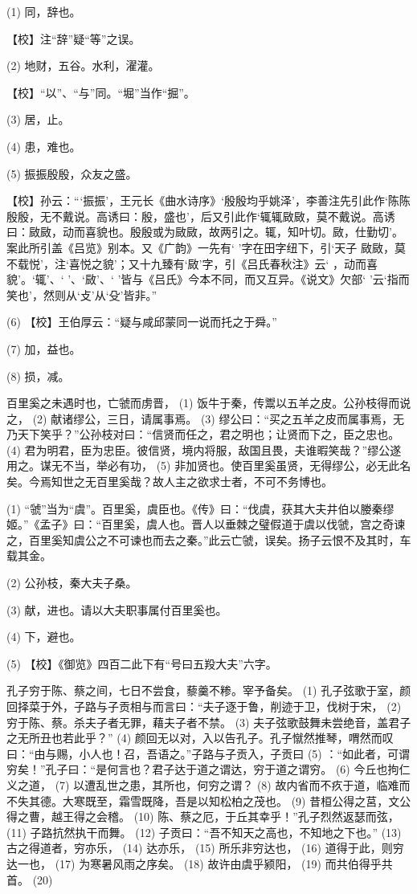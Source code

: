\documentclass[12pt,UTF8]{ctexbook}
\begin{document}
(1) 同，辞也。

【校】注“辞”疑“等”之误。

(2) 地财，五谷。水利，濯灌。

【校】“以”、“与”同。“堀”当作“掘”。

(3) 居，止。

(4) 患，难也。

(5) 振振殷殷，众友之盛。

【校】孙云：“‘振振’，王元长《曲水诗序》‘殷殷均乎姚泽’，李善注先引此作‘陈陈殷殷，无不戴说。高诱曰：殷，盛也’，后又引此作‘辄辄敐敐，莫不戴说。高诱曰：敐敐，动而喜貌也。殷殷或为敐敐，故两引之。辄，知叶切。敐，仕勤切’。案此所引盖《吕览》别本。又《广韵》一先有‘ ’字在田字纽下，引‘天子 敐敐，莫不载悦’，注‘喜悦之貌’；又十九臻有‘敐’字，引《吕氏春秋注》云‘ ，动而喜貌’。‘辄’、‘ ’、‘敐’、‘ ’皆与《吕氏》今本不同，而又互异。《说文》欠部‘ ’云‘指而笑也’，然则从‘攴’从‘殳’皆非。”

(6) 【校】王伯厚云：“疑与咸邱蒙同一说而托之于舜。”

(7) 加，益也。

(8) 损，减。

百里奚之未遇时也，亡虢而虏晋， (1) 饭牛于秦，传鬻以五羊之皮。公孙枝得而说之， (2) 献诸缪公，三日，请属事焉。 (3) 缪公曰：“买之五羊之皮而属事焉，无乃天下笑乎？”公孙枝对曰：“信贤而任之，君之明也；让贤而下之，臣之忠也。 (4) 君为明君，臣为忠臣。彼信贤，境内将服，敌国且畏，夫谁暇笑哉？”缪公遂用之。谋无不当，举必有功， (5) 非加贤也。使百里奚虽贤，无得缪公，必无此名矣。今焉知世之无百里奚哉？故人主之欲求士者，不可不务博也。

(1) “虢”当为“虞”。百里奚，虞臣也。《传》曰：“伐虞，获其大夫井伯以媵秦缪姬。”《孟子》曰：“百里奚，虞人也。晋人以垂棘之璧假道于虞以伐虢，宫之奇谏之，百里奚知虞公之不可谏也而去之秦。”此云亡虢，误矣。扬子云恨不及其时，车载其金。

(2) 公孙枝，秦大夫子桑。

(3) 献，进也。请以大夫职事属付百里奚也。

(4) 下，避也。

(5) 【校】《御览》四百二此下有“号曰五羖大夫”六字。

孔子穷于陈、蔡之间，七日不尝食，藜羹不糁。宰予备矣。 (1) 孔子弦歌于室，颜回择菜于外，子路与子贡相与而言曰：“夫子逐于鲁，削迹于卫，伐树于宋， (2) 穷于陈、蔡。杀夫子者无罪，藉夫子者不禁。 (3) 夫子弦歌鼓舞未尝绝音，盖君子之无所丑也若此乎？” (4) 颜回无以对，入以告孔子。孔子憱然推琴，喟然而叹曰：“由与赐，小人也！召，吾语之。”子路与子贡入，子贡曰 (5) ：“如此者，可谓穷矣！”孔子曰：“是何言也？君子达于道之谓达，穷于道之谓穷。 (6) 今丘也拘仁义之道， (7) 以遭乱世之患，其所也，何穷之谓？ (8) 故内省而不疚于道，临难而不失其德。大寒既至，霜雪既降，吾是以知松柏之茂也。 (9) 昔桓公得之莒，文公得之曹，越王得之会稽。 (10) 陈、蔡之厄，于丘其幸乎！”孔子烈然返瑟而弦， (11) 子路抗然执干而舞。 (12) 子贡曰：“吾不知天之高也，不知地之下也。” (13) 古之得道者，穷亦乐， (14) 达亦乐， (15) 所乐非穷达也， (16) 道得于此，则穷达一也， (17) 为寒暑风雨之序矣。 (18) 故许由虞乎颍阳， (19) 而共伯得乎共首。 (20)
\end{document}
